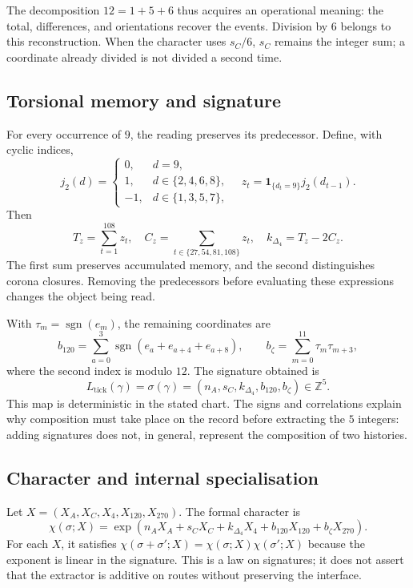 The decomposition \(12=1+5+6\) thus acquires an operational meaning:
the total, differences, and orientations recover the events.
Division by \(6\) belongs to this reconstruction. When the character
uses \(s_C/6\), \(s_C\) remains the integer sum; a coordinate already
divided is not divided a second time.

\subsection{Torsional memory and signature}

For every occurrence of \(9\), the reading preserves its predecessor.
Define, with cyclic indices,
\[
 j_2(d)=\begin{cases}0,&d=9,\\1,&d\in\{2,4,6,8\},\\-1,&d\in\{1,3,5,7\},\end{cases}
 \quad z_t=\mathbf1_{\{d_t=9\}}j_2(d_{t-1}).
\]
Then
\[
 T_z=\sum_{t=1}^{108}z_t,\quad
 C_z=\sum_{t\in\{27,54,81,108\}}z_t,\quad
 k_{\Delta_4}=T_z-2C_z.
\]
The first sum preserves accumulated memory, and the second distinguishes
corona closures. Removing the predecessors before evaluating these
expressions changes the object being read.

With \(\tau_m=\operatorname{sgn}(e_m)\), the remaining coordinates are
\[
 b_{120}=\sum_{a=0}^{3}\operatorname{sgn}(e_a+e_{a+4}+e_{a+8}),
 \qquad b_{\zeta}=\sum_{m=0}^{11}\tau_m\tau_{m+3},
\]
where the second index is modulo \(12\). The signature obtained is
\[
 L_{\mathrm{tick}}(\gamma)
 =\sigma(\gamma)=(n_A,s_C,k_{\Delta_4},b_{120},b_{\zeta})\in\mathbb Z^5.
\]
This map is deterministic in the stated chart. The signs and
correlations explain why composition must take place on the
record before extracting the \(5\) integers: adding signatures does not,
in general, represent the composition of two histories.



\subsection{Character and internal specialisation}

Let \(X=(X_A,X_C,X_4,X_{120},X_{270})\). The formal character is
\[
 \chi(\sigma;X)=\exp\!\left(n_AX_A+s_CX_C+k_{\Delta_4}X_4+
 b_{120}X_{120}+b_{\zeta}X_{270}\right).
\]
For each \(X\), it satisfies
\(\chi(\sigma+\sigma';X)=\chi(\sigma;X)\chi(\sigma';X)\)
because the exponent is linear in the signature. This is a law on signatures; it
does not assert that the extractor is additive on routes without preserving the interface.

